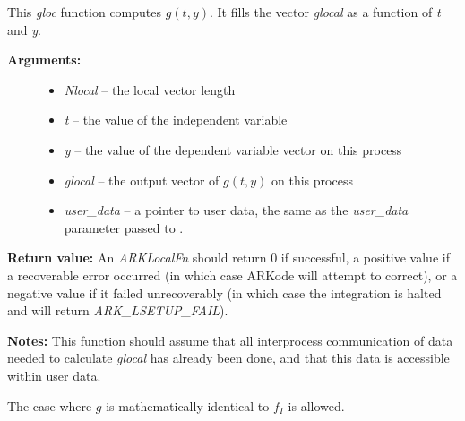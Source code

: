\documentclass[letterpaper,10pt,english]{sphinxmanual}
\begin{document}
\begin{fulllineitems}
\label{c_interface/Preconditioners:ARKLocalFn}
This \emph{gloc} function computes $g(t,y)$.  It
fills the vector \emph{glocal} as a function of \emph{t} and \emph{y}.
\begin{description}
\item[{\textbf{Arguments:}}] \leavevmode\begin{itemize}
\item {} 
\emph{Nlocal} -- the local vector length

\item {} 
\emph{t} -- the value of the independent variable

\item {} 
\emph{y} -- the value of the dependent variable vector on this process

\item {} 
\emph{glocal} -- the output vector of $g(t,y)$ on this process

\item {} 
\emph{user\_data} -- a pointer to user data, the same as the
\emph{user\_data} parameter passed to {\hyperref[c_interface/User_callable:ARKodeSetUserData]{}}.

\end{itemize}

\end{description}

\textbf{Return value:}
An \emph{ARKLocalFn} should return 0 if successful, a positive value if
a recoverable error occurred (in which case ARKode will attempt to
correct), or a negative value if it failed unrecoverably (in which
case the integration is halted and {\hyperref[c_interface/User_callable:ARKode]{}} will return
\emph{ARK\_LSETUP\_FAIL}).

\textbf{Notes:}  This function should assume that all interprocess
communication of data needed to calculate \emph{glocal} has already been
done, and that this data is accessible within user data.

The case where $g$ is mathematically identical to $f_I$
is allowed.

\end{fulllineitems}

\end{document}
